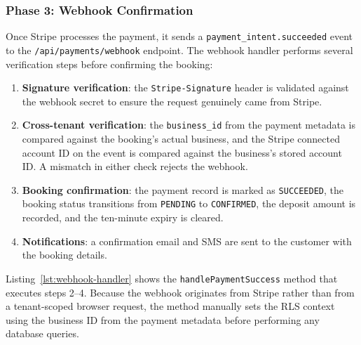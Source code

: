 \subsubsection*{Phase 3: Webhook Confirmation}
Once Stripe processes the payment, it sends a \texttt{payment\_intent.succeeded} event to the \texttt{/api/payments/webhook} endpoint. The webhook handler performs several verification steps before confirming the booking:

\begin{enumerate}
    \item \textbf{Signature verification}: the \texttt{Stripe-Signature} header is validated against the webhook secret to ensure the request genuinely came from Stripe.
    \item \textbf{Cross-tenant verification}: the \texttt{business\_id} from the payment metadata is compared against the booking's actual business, and the Stripe connected account ID on the event is compared against the business's stored account ID. A mismatch in either check rejects the webhook.
    \item \textbf{Booking confirmation}: the payment record is marked as \texttt{SUCCEEDED}, the booking status transitions from \texttt{PENDING} to \texttt{CONFIRMED}, the deposit amount is recorded, and the ten-minute expiry is cleared.
    \item \textbf{Notifications}: a confirmation email and SMS are sent to the customer with the booking details.
\end{enumerate}

Listing~\ref{lst:webhook-handler} shows the \texttt{handlePaymentSuccess} method that executes steps 2--4. Because the webhook originates from Stripe rather than from a tenant-scoped browser request, the method manually sets the RLS context using the business ID from the payment metadata before performing any database queries.

